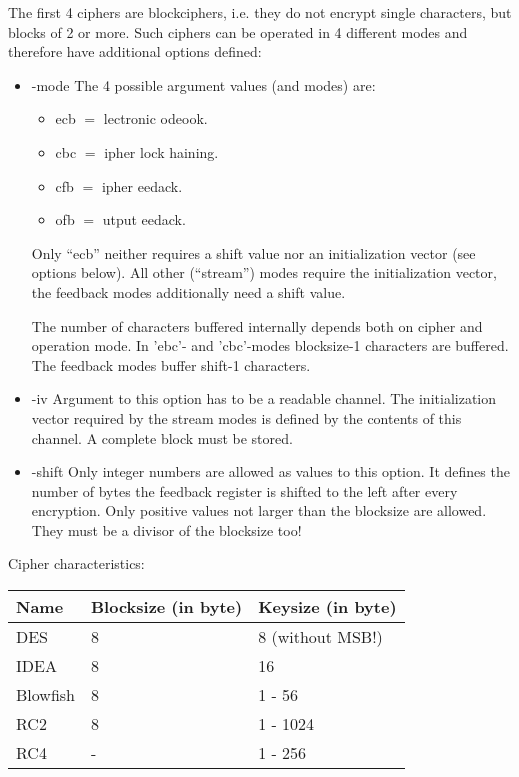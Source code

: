\documentclass {report}
\begin{document}
The first 4 ciphers are blockciphers, i.e. they do not encrypt single
characters, but blocks of 2 or more. Such ciphers can be operated in 4
different modes and therefore have additional options defined:

\begin {itemize}
\item[-mode]	The 4 possible argument values (and modes) are:
	\begin {itemize}
	\item[ecb]	$=$ lectronic odeook.
	\item[cbc]	$=$ ipher lock haining.
	\item[cfb]	$=$ ipher eedack.
	\item[ofb]	$=$ utput eedack.
	\end   {itemize}

	Only ``ecb'' neither requires a shift value nor an initialization
	vector (see options below). All other (``stream'') modes require
	the initialization vector, the feedback modes additionally
	need a shift value.

	The number of characters buffered internally depends both on
	cipher and operation mode.
	In 'ebc'- and 'cbc'-modes blocksize-1 characters are buffered.
	The feedback modes buffer shift-1 characters.


\item[-iv]	Argument to this option has to be a readable
		channel. The initialization vector required by the
		stream modes is defined by the contents of this
		channel. A complete block must be stored.

\item[-shift]	Only integer numbers are allowed as values to this
		option. It defines the number of bytes the feedback
		register is shifted to the left after every
		encryption. Only positive values not larger than the
		blocksize are allowed. They must be a divisor of the
		blocksize too!
\end   {itemize}


Cipher characteristics:

\begin {center}
	\begin {tabular}{|l|l|l|}\hline
	Name		& Blocksize (in byte)	& Keysize (in byte) \\ \hline\hline
	DES		& 8			& 8 (without MSB!) \\ \hline
	IDEA		& 8			& 16 \\ \hline
	Blowfish	& 8			& 1 - 56 \\ \hline
	RC2		& 8			& 1 - 1024 \\ \hline\hline
	RC4		& -			& 1 - 256 \\ \hline
	\end   {tabular}
\end   {center}
\end{document}
